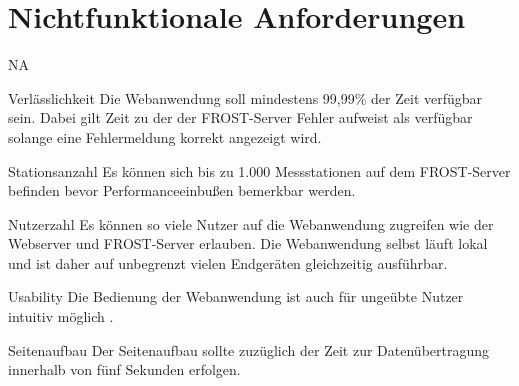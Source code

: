 \section{Nichtfunktionale Anforderungen}

\setcounter{counter}{10}
\begin{Kriterien}{NA}
    \item[Verlässlichkeit]
        Die \gls{Webanwendung} soll mindestens 99,99\% der Zeit verfügbar sein.
        Dabei gilt Zeit zu der der \gls{FROST-Server} Fehler aufweist als verfügbar solange eine Fehlermeldung korrekt angezeigt wird.
    \item[Stationsanzahl]
        Es können sich bis zu 1.000 Messstationen auf dem \gls{FROST-Server} befinden bevor Performanceeinbußen bemerkbar werden.
    \item[Nutzerzahl]
        Es können so viele Nutzer auf die \gls{Webanwendung} zugreifen wie der \gls{Webserver} und \gls{FROST-Server} erlauben.
        Die \gls{Webanwendung} selbst läuft lokal und ist daher auf unbegrenzt vielen Endgeräten gleichzeitig ausführbar.
    \item[Usability]
        Die Bedienung der \gls{Webanwendung} ist auch für ungeübte Nutzer intuitiv möglich .
    \item[Seitenaufbau]
        Der Seitenaufbau sollte zuzüglich der Zeit zur Datenübertragung innerhalb von fünf Sekunden erfolgen.
\end{Kriterien}